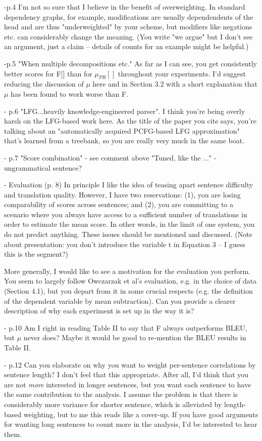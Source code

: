 \documentclass[letterpaper,12pt]{article}
\begin{document}
-p.4 I'm not so sure that I believe in the benefit of overweighting.
 In standard dependency graphs, for example, modifications are usually
 dependendents of the head and are thus "underweighted" by your scheme,
 but modifiers like negations etc. can considerably change the meaning.
 (You write "we argue" but I don't see an argument, just a claim --
  details of counts for an example might be helpful.)

-p.5 "When multiple decompositions etc." As far as I can see, you
 get consistently better scores for F[] than for $\mu_{PR}[]$ throughout
 your experiments.  I'd suggest reducing the discussion of $\mu$ here
 and in Section 3.2 with a short explanation that $\mu$ has been found to
 work worse than F.

- p.6 "LFG...heavily knowledge-engineered parser". I think you're being
 overly harsh on the LFG-based work here. As the title of the paper you
 cite says, you're talking about an "automatically acquired PCFG-based
 LFG approximation" that's learned from a treebank, so you are really
 very much in the same boat.

- p.7 "Score combination" - see comment above
     "Tuned, like the ..." - ungrammatical sentence?

- Evaluation (p. 8) In principle I like the idea of teasing apart
 sentence difficulty and translation quality. However, I have two
 reservations: (1), you are losing comparability of scores across
 sentences; and (2), you are committing to a scenario where you
 always have access to a sufficient number of translations in order
 to estimate the mean score. In other words, in the limit of one
 system, you do not predict anything.  These issues should be
 mentioned and discussed.  (Note about presentation: you don't
 introduce the variable t in Equation 3 -- I guess this is the
 segment?)
 
 More generally, I would like to see a motivation for the evaluation
 you perform. You seem to largely follow Owczarzak et al's
 evaluation, e.g. in the choice of data (Section 4.1), but you depart
 from it in some crucial respects (e.g. the definition of the
 dependent variable by mean subtraction). Can you provide a clearer
 description of why each experiment is set up in the way it is?

- p.10 Am I right in reading Table II to say that F always outperforms
 BLEU, but $\mu$ never does? Maybe it would be good to re-mention the
 BLEU results in Table II.

- p.12 Can you elaborate on why you want to weight per-sentence
 correlations by sentence length? I don't feel that this
 appropriate. After all, I'd think that you are not \emph{more} interested
 in longer sentences, but you want each sentence to have the same
 contribution to the analysis. I assume the problem is that there is
 considerably more variance for shorter sentence, which is alleviated
 by length-based weighting, but to me this reads like a cover-up. If
 you have good arguments for wanting long sentences to count more in
 the analysis, I'd be interested to hear them.
\end{document}
